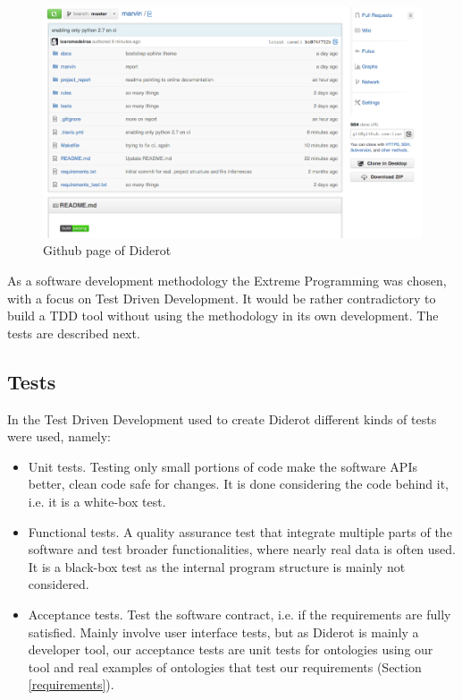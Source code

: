 \documentclass{report}
\begin{document}
\begin{figure}[!hbt]
    \centering
    \label{figGithub}
    \caption{Github page of Diderot}
    \includegraphics[scale=0.4]{fig/github.png}
\end{figure}

As a software development methodology the Extreme Programming \cite{beck04} was chosen, with a focus on Test Driven
Development. It would be rather contradictory to build a TDD tool without using the methodology in its own development.
The tests are described next.

\subsection{Tests}
\label{tests}

In the Test Driven Development used to create Diderot different kinds of tests were used, namely:

\begin{itemize}
    \item Unit tests. Testing only small portions of code make the software APIs better, clean code safe for changes.
        It is done considering the code behind it, i.e. it is a white-box test.
    \item Functional tests. A quality assurance test that integrate multiple parts of the software and test broader
        functionalities, where nearly real data is often used.
        It is a black-box test as the internal program structure is mainly not considered.
    \item Acceptance tests. Test the software contract, i.e. if the requirements are fully satisfied. Mainly involve
        user interface tests, but as Diderot is mainly a developer tool, our acceptance tests are unit tests for ontologies
        using our tool and real examples of ontologies that test our requirements (Section \ref{requirements}).
\end{itemize}
\end{document}
